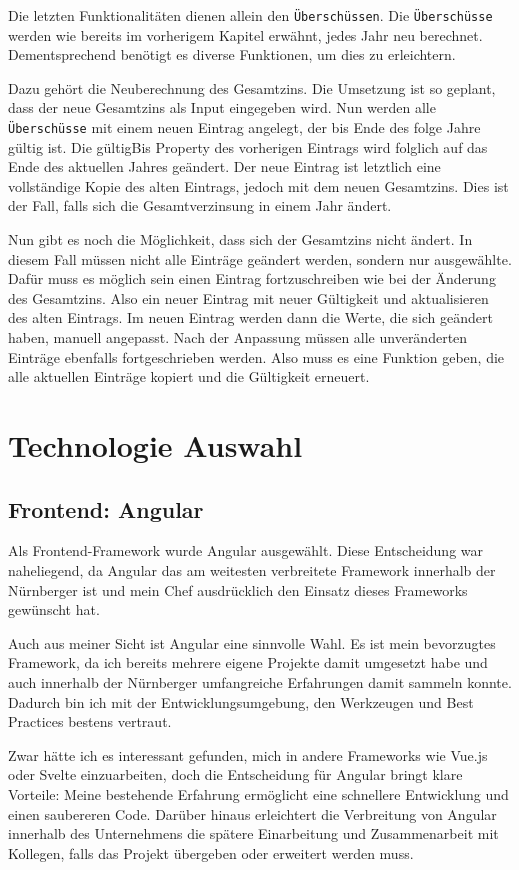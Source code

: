 Die letzten Funktionalitäten dienen allein den \texttt{Überschüssen}. Die \texttt{Überschüsse} werden wie bereits im vorherigem Kapitel erwähnt, jedes Jahr neu berechnet.
Dementsprechend benötigt es diverse Funktionen, um dies zu erleichtern. 

Dazu gehört die Neuberechnung des Gesamtzins. Die Umsetzung ist so geplant, dass der neue Gesamtzins als Input eingegeben wird.
Nun werden alle \texttt{Überschüsse} mit einem neuen Eintrag angelegt, der bis Ende des folge Jahre gültig ist. Die gültigBis Property des vorherigen Eintrags wird folglich auf das Ende des aktuellen Jahres geändert.
Der neue Eintrag ist letztlich eine vollständige Kopie des alten Eintrags, jedoch mit dem neuen Gesamtzins. Dies ist der Fall, falls sich die Gesamtverzinsung in einem Jahr ändert.

Nun gibt es noch die Möglichkeit, dass sich der Gesamtzins nicht ändert. In diesem Fall müssen nicht alle Einträge geändert werden, sondern nur ausgewählte. 
Dafür muss es möglich sein einen Eintrag fortzuschreiben wie bei der Änderung des Gesamtzins. Also ein neuer Eintrag mit neuer Gültigkeit und aktualisieren des alten Eintrags.
Im neuen Eintrag werden dann die Werte, die sich geändert haben, manuell angepasst. Nach der Anpassung müssen alle unveränderten Einträge ebenfalls fortgeschrieben werden. 
Also muss es eine Funktion geben, die alle aktuellen Einträge kopiert und die Gültigkeit erneuert.

\section{Technologie Auswahl}
\subsection{Frontend: Angular}
Als Frontend-Framework wurde Angular ausgewählt. Diese Entscheidung war naheliegend, da Angular das am weitesten verbreitete Framework innerhalb der Nürnberger ist und mein Chef ausdrücklich den Einsatz dieses Frameworks gewünscht hat.

Auch aus meiner Sicht ist Angular eine sinnvolle Wahl. Es ist mein bevorzugtes Framework, da ich bereits mehrere eigene Projekte damit umgesetzt habe und auch innerhalb der Nürnberger umfangreiche Erfahrungen damit sammeln konnte. 
Dadurch bin ich mit der Entwicklungsumgebung, den Werkzeugen und Best Practices bestens vertraut.

Zwar hätte ich es interessant gefunden, mich in andere Frameworks wie Vue.js oder Svelte einzuarbeiten, doch die Entscheidung für Angular bringt klare Vorteile: 
Meine bestehende Erfahrung ermöglicht eine schnellere Entwicklung und einen saubereren Code. Darüber hinaus erleichtert die Verbreitung von Angular innerhalb des Unternehmens die spätere Einarbeitung und Zusammenarbeit mit Kollegen, falls das Projekt übergeben oder erweitert werden muss.
